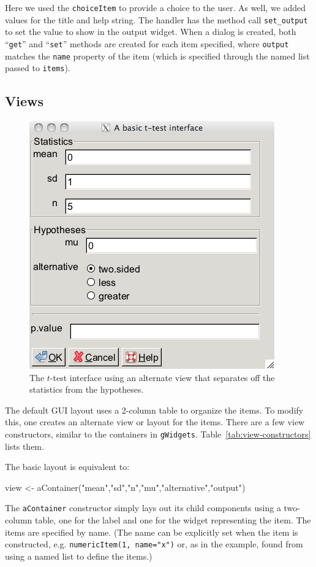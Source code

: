 \documentclass{article}
\newcommand{\code}[1]{\texttt{#1}} %
\newcommand{\function}[1]{\code{#1}} %
\newcommand{\constructor}[1]{\function{#1}\index{#1}}
\newcommand{\generic}[1]{\code{#1}} %
\newcommand{\meth}[1]{\generic{#1}}     %
\newcommand{\pkg}[1]{\texttt{#1}}
\begin{document}
Here we used the \constructor{choiceItem} to provide a choice to the
user. As well, we added values for the title and  help string. The
handler has the method call \meth{set\_output} to set the value to
show in the output widget. When a dialog is created, both ``\code{get}'' and ``\code{set}''
methods are created for each item specified, where \code{output}
matches the \code{name} property of the item (which is specified
through the named list passed to \code{items}).


\subsection{Views}
\label{sec:views}

\begin{figure}
  \centering
  \includegraphics[width=.6\textwidth]{t-test-2}
  \caption{The $t$-test interface using an alternate view that
    separates off the statistics from the hypotheses.}
  \label{fig:t-test-2}
\end{figure}


The default GUI layout uses a 2-column table to organize the
items. To modify this, one creates an alternate view or layout for the
items. There are a few view constructors, similar to the containers in
\pkg{gWidgets}. Table~\ref{tab:view-constructors} lists them.


The basic layout is equivalent to:
\begin{Schunk}
\begin{Sinput}
 view <- aContainer("mean","sd","n","mu","alternative","output")
\end{Sinput}
\end{Schunk}
The \constructor{aContainer} constructor simply lays out its child components
using a two-column table, one for the label and one for the widget
representing the item.
The items are specified by name. (The name can be explicitly set when
the item is constructed, e.g. \code{numericItem(1, name="x")} or, as
in the example, found from using a named list to define the items.)
\end{document}
